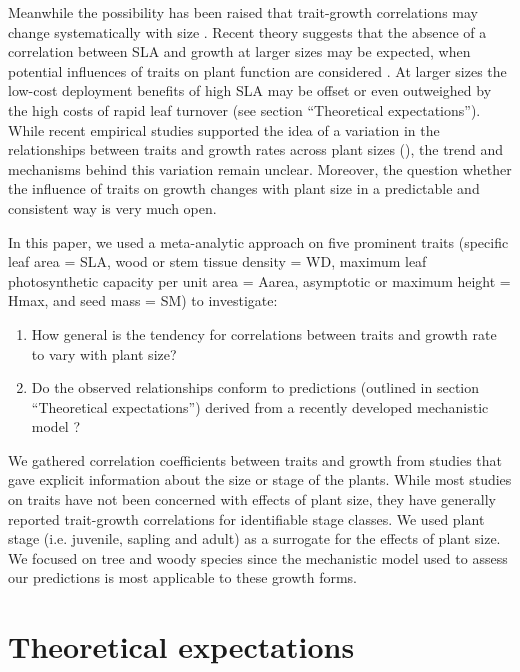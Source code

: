 \documentclass[a4paper,11pt]{article}
\begin{document}
Meanwhile the possibility has been raised that trait-growth correlations may change systematically with size \citep{Falster:2011ii, Ruger:2012jv, Iida:2014ep, Iida:2014hq}. Recent theory suggests that the absence of a correlation between SLA and growth at larger sizes may be expected, when potential influences of traits on plant function are considered \citep{Falster:2011ii}. At larger sizes the low-cost deployment benefits of high SLA may be offset or even outweighed by the high costs of rapid leaf turnover (see section ``Theoretical expectations''). While recent empirical studies supported the idea of a variation in the relationships between traits and growth rates across plant sizes (\citealt{Iida:2014ep, Iida:2014hq}), the trend and mechanisms behind this variation remain unclear. Moreover, the question whether the influence of traits on growth changes with plant size in a predictable and consistent way is very much open.

In this paper, we used a meta-analytic approach on five prominent traits (specific leaf area = SLA, wood or stem tissue density = WD, maximum leaf photosynthetic capacity per unit area = Aarea, asymptotic or maximum height = Hmax, and seed mass = SM) to investigate:
\begin{enumerate}
  \item How general is the tendency for correlations between traits and growth rate to vary with plant size?
  \item  Do the observed relationships conform to predictions (outlined in section ``Theoretical expectations'') derived from a recently developed mechanistic model \citep{Falster:2011ii}?
\end{enumerate}
We gathered correlation coefficients between traits and growth from studies that gave explicit information about the size or stage of the plants. While most studies on traits have not been concerned with effects of plant size, they have generally reported trait-growth correlations for identifiable stage classes. We used plant stage (i.e. juvenile, sapling and adult) as a surrogate for the effects of plant size. We focused on tree and woody species since the mechanistic model used to assess our predictions is most applicable to these growth forms.

\section*{Theoretical expectations}\label{theory}
\end{document}
